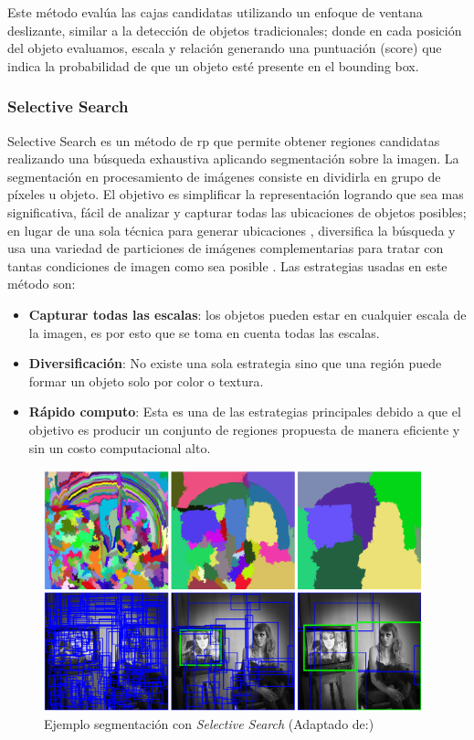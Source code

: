 Este método evalúa las cajas candidatas utilizando un enfoque de ventana deslizante, similar a la detección de objetos tradicionales; donde en cada posición del objeto evaluamos, escala y relación generando una puntuación (score) que indica la probabilidad de que un objeto esté presente en el bounding box.


\subsubsection*{Selective Search} \label{sub:selectivesearch}
Selective Search es un método de \ac{rp} que  permite obtener regiones candidatas realizando una búsqueda exhaustiva aplicando segmentación sobre la imagen. La segmentación  en procesamiento de imágenes consiste en dividirla en grupo de píxeles u objeto. El objetivo es simplificar la representación logrando que sea mas significativa, fácil de analizar y capturar todas las ubicaciones de objetos posibles; en lugar de una sola técnica para generar ubicaciones , diversifica la  búsqueda y usa  una variedad de particiones de imágenes complementarias para tratar con tantas condiciones de imagen como sea posible \citep{selectivesearch}.
Las estrategias usadas en este método son:
\begin{itemize}
\item \textbf{Capturar todas las escalas}: los objetos pueden estar en cualquier escala de la imagen, es por esto que se toma en cuenta todas las escalas.
\item \textbf{Diversificación}: No existe una sola estrategia sino que una región puede formar un objeto solo por color o textura.
\item \textbf{Rápido computo}: Esta es una de las estrategias principales debido a que el objetivo es producir un conjunto de regiones propuesta de manera eficiente y sin un costo computacional alto.
\end{itemize}

\begin{figure}[h]
 \centering
  \includegraphics[height=7cm,keepaspectratio=true,clip=true]{imagenes/Logos/selectivesearch.png}
  \caption{Ejemplo segmentación con \textit{Selective Search} (Adaptado de:\citep{selectivesearch})}
	\label{Fig: overlapping}
\end{figure}


